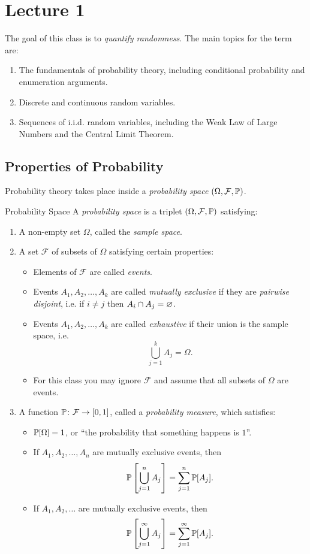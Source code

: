 \documentclass[class=article, crop=false]{standalone}
\begin{document}
  \section{Lecture 1}
  The goal of this class is to \emph{quantify randomness}. The main topics for the term are:
  \begin{enumerate}
    \item The fundamentals of probability theory, including conditional probability and enumeration arguments.
    \item Discrete and continuous random variables.
    \item Sequences of i.i.d. random variables, including the Weak Law of Large Numbers and the Central Limit Theorem.
  \end{enumerate}
  \subsection{Properties of Probability}
  Probability theory takes place inside a \emph{probability space} $(\Omega, \mathcal{F}, \P)$.
  \begin{definition}{Probability Space}
    A \emph{probability space} is a triplet $(\Omega, \mathcal{F}, \P)$ satisfying:
    \begin{enumerate}
      \item A non-empty set $\Omega$, called the \emph{sample space}.
      \item A set $\mathcal{F}$ of subsets of $\Omega$ satisfying certain properties:
      \begin{itemize}
        \item Elements of $\mathcal{F}$ are called \emph{events}.
        \item Events $A_1, A_2, \dotsc, A_k$ are called \emph{mutually exclusive} if they are \emph{pairwise disjoint}, i.e. if $i\neq j$ then $A_i\cap A_j = \es$.
        \item Events $A_1, A_2, \dotsc, A_k$ are called \emph{exhaustive} if their union is the sample space, i.e.
        \[
          \bigcup_{j = 1}^k A_j = \Omega.
        \]
        \item For this class you may ignore $\mathcal{F}$ and assume that all subsets of $\Omega$ are events.
      \end{itemize}
      \item A function $\P\colon \mathcal{F}\to [0, 1]$, called a \emph{probability measure}, which satisfies:
      \begin{itemize}
        \item $\P[\Omega] = 1$, or ``the probability that something happens is $1$''.
        \item If $A_1, A_2, \dotsc, A_n$ are mutually exclusive events, then
        \[
          \P\left[\bigcup_{j = 1}^n A_j\right] = \sum_{j=1}^{n} \mathbb{P}[A_j].
        \]
        \item If $A_1, A_2, \dotsc$ are mutually exclusive events, then
        \[
          \P\left[\bigcup_{j = 1}^\infty A_j\right] = \sum_{j=1}^{\infty} \mathbb{P}[A_j].
        \]
      \end{itemize}
    \end{enumerate}
  \end{definition}
\end{document}
